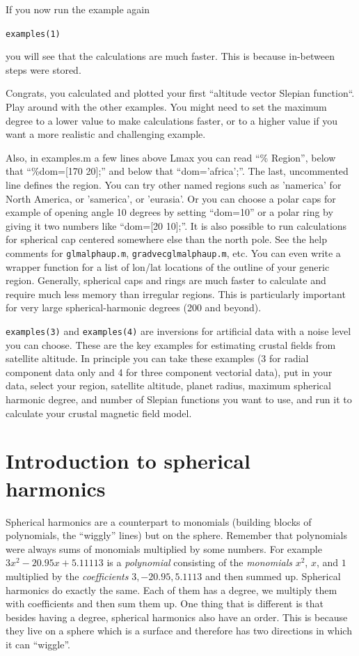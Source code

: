\documentclass[11pt]{article}
\begin{document}
If you now run the example again

\qquad \verb+examples(1)+

you will see that the calculations are much faster. This is because in-between steps were stored.

Congrats, you calculated and plotted your first ``altitude vector Slepian function``. Play around with the other examples. You might need to set the maximum degree to a lower value to make calculations faster, or to a higher value if you want a more realistic and challenging example.

Also, in examples.m a few lines above Lmax you can read ``\% Region'', below that ``\%dom=[170 20];'' and below that ``dom='africa';''. The last, uncommented line defines the region. You can try other named regions such as 'namerica' for North America, or 'samerica', or 'eurasia'. Or you can choose a polar caps for example of opening angle 10 degrees by setting ``dom=10'' or a polar ring by giving it two numbers like ``dom=[20 10];''. It is also possible to run calculations for spherical cap centered somewhere else than the north pole. See the help comments for \verb+glmalphaup.m+, \verb+gradvecglmalphaup.m+, etc. You can even write a wrapper function for a list of lon/lat locations of the outline of your generic region. Generally, spherical caps and rings are much faster to calculate and require much less memory than irregular regions. This is particularly important for very large spherical-harmonic degrees (200 and beyond).

\verb+examples(3)+ and \verb+examples(4)+ are inversions for artificial data with a noise level you can choose. These are the key examples for estimating crustal fields from satellite altitude. In principle you can take these examples (3 for radial component data only and 4 for three component vectorial data), put in your data, select your region, satellite altitude, planet radius, maximum spherical harmonic degree, and number of Slepian functions you want to use, and run it to calculate your crustal magnetic field model.

\section{Introduction to spherical harmonics}

Spherical harmonics are a counterpart to monomials (building blocks of polynomials, the ``wiggly'' lines) but on the sphere. Remember that polynomials were always sums of monomials multiplied by some numbers. For example $3x^2 - 20.95x + 5.11113$ is a \emph{polynomial} consisting of the \emph{monomials} $x^2$, $x$, and $1$ multiplied by the \emph{coefficients} $3, -20.95, 5.1113$ and then summed up. Spherical harmonics do exactly the same. Each of them has a degree, we multiply them with coefficients and then sum them up. One thing that is different is that besides having a degree, spherical harmonics also have an order. This is because they live on a sphere which is a surface and therefore has two directions in which it can ``wiggle''. 
\end{document}
